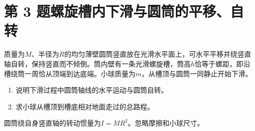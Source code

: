 \documentclass[UTF8,fontset=fandol,a4paper,11pt]{ctexart}
\begin{document}

\section*{第 3 题\quad 螺旋槽内下滑与圆筒的平移、自转}\label{q:3}


质量为$M$、半径为$R$的均匀薄壁圆筒竖直放在光滑水平面上，可水平平移并绕竖直轴自转，保持竖直而不倾倒。筒内壁有一条光滑螺旋槽，筒高$h$恰等于螺距，即沿槽绕筒一周恰从顶端到达底端。小球质量为$m$，从槽顶与圆筒一同静止开始下滑。
\begin{enumerate}
\item 说明下滑过程中圆筒轴线的水平运动与圆筒自转。
\item 求小球从槽顶到槽底相对地面走过的总路程。
\end{enumerate}
圆筒绕自身竖直轴的转动惯量为$I=MR^2$。忽略摩擦和小球尺寸。
\end{document}
